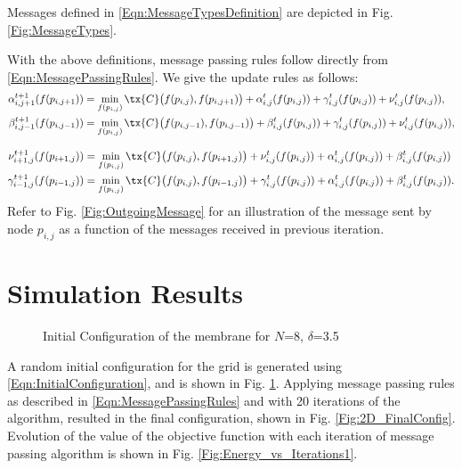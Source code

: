 \documentclass[journal, onecolumn]{IEEEtran}
\begin{document}
Messages defined in \eqref{Eqn:MessageTypesDefinition} are depicted in Fig. \ref{Fig:MessageTypes}.

With the above definitions, message passing rules follow directly from \eqref{Eqn:MessagePassingRules}. We give the update rules as follows:
\begin{align*}
\alpha_{i,j+1}^{t+1}(f(p_{i,j+1}))&=\min_{f(p_{i,j})}\tx{C}\big(f(p_{i,j}),f(p_{i,j+1})\big)+\alpha_{i,j}^{t}(f(p_{i,j})) +\gamma_{i,j}^{t}(f(p_{i,j})) + \nu_{i,j}^{t}(f(p_{i,j})),\\
\beta_{i,j-1}^{t+1}(f(p_{i,j-1}))&=\min_{f(p_{i,j})}\tx{C}\big(f(p_{i,j-1}),f(p_{i,j-1})\big)+\beta_{i,j}^{t}(f(p_{i,j})) +\gamma_{i,j}^{t}(f(p_{i,j})) + \nu_{i,j}^{t}(f(p_{i,j})),
\end{align*}

\begin{align}
\nu_{i+1,j}^{t+1}(f(p_{i+1,j}))&=\min_{f(p_{i,j})}\tx{C}\big(f(p_{i,j}),f(p_{i+1,j})\big)+\nu_{i,j}^{t}(f(p_{i,j})) +\alpha_{i,j}^{t}(f(p_{i,j})) + \beta_{i,j}^{t}(f(p_{i,j}))\notag\\
\gamma_{i-1,j}^{t+1}(f(p_{i-1,j}))&=\min_{f(p_{i,j})}\tx{C}\big(f(p_{i,j}),f(p_{i-1,j})\big)+\gamma_{i,j}^{t}(f(p_{i,j})) +\alpha_{i,j}^{t}(f(p_{i,j})) + \beta_{i,j}^{t}(f(p_{i,j})).\label{Eqn:MessagePassingRules}
\end{align}
Refer to Fig. \ref{Fig:OutgoingMessage} for an illustration of the message sent by node $p_{i,j}$ as a function of the messages received in previous iteration.

\section{Simulation Results}
\label{Section:SimulationResults}
\begin{figure}[h!]
\centering

\caption{Initial Configuration of the membrane for $N$=8, $\delta$=3.5}
\label{Fig:2D_InitialConfig}
\end{figure}

A random initial configuration for the grid is generated using \eqref{Eqn:InitialConfiguration}, and is shown in Fig. \ref{Fig:2D_InitialConfig}. Applying message passing rules as described in \eqref{Eqn:MessagePassingRules} and with 20 iterations of the algorithm, resulted in the final
configuration, shown in Fig. \ref{Fig:2D_FinalConfig}. Evolution of the value of the objective function with each iteration of message passing algorithm is shown in Fig. \ref{Fig:Energy_vs_Iterations1}.
\end{document}
